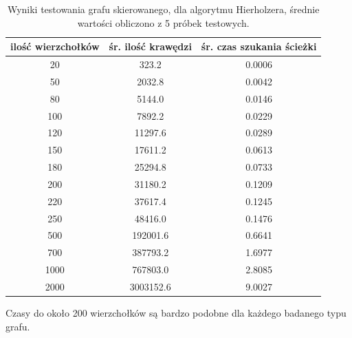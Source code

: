 \documentclass[a4paper, 12pt, twoside, openright]{article}
\begin{document}
\begin{table}[H]
	\centering
	\caption{Wyniki testowania grafu skierowanego, dla algorytmu Hierholzera, średnie wartości obliczono z 5 próbek testowych.}
	
	\resizebox{14.5cm}{!}
	{
		\begin{tabular}{|c c c|}
			\hline
			ilość wierzchołków	& śr. ilość krawędzi 		& śr. czas szukania ścieżki\\ \hline \hline
			20 	& 323.2  		& 0.0006 	\\ \hline
			50 	& 2032.8 		& 0.0042 	\\ \hline
			80 	& 5144.0        & 0.0146	\\ \hline
			100 & 7892.2        & 0.0229	\\ \hline
			120 & 11297.6       & 0.0289	\\ \hline
			150 & 17611.2 		& 0.0613	\\ \hline
			180 & 25294.8       & 0.0733	\\ \hline
			200 & 31180.2  		& 0.1209	\\ \hline
			220 & 37617.4 		& 0.1245	\\ \hline
			250 & 48416.0   	& 0.1476	\\ \hline
			500 & 192001.6   	& 0.6641	\\ \hline				
			700 & 387793.2		& 1.6977	\\ \hline
			1000& 767803.0	    & 2.8085	\\ \hline
			2000& 3003152.6	  	& 9.0027	\\ \hline
		\end{tabular} 
	}
	\label{Tab:Hie_DiG}
\end{table}

Czasy do około 200 wierzchołków są bardzo podobne dla każdego badanego typu grafu.
\end{document}
